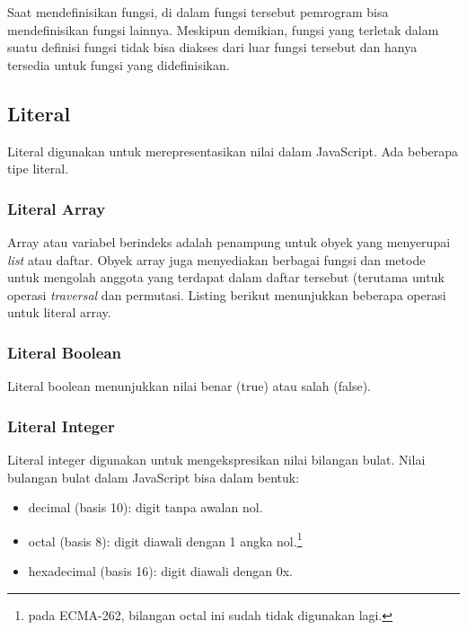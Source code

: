 Saat mendefinisikan fungsi, di dalam fungsi tersebut pemrogram bisa mendefinisikan fungsi lainnya. Meskipun demikian, fungsi yang terletak dalam suatu definisi fungsi tidak bisa diakses dari luar fungsi tersebut dan hanya tersedia untuk fungsi yang didefinisikan.

\lstset{language=JavaScript,caption=Fungsi di dalam Fungsi}


\subsection{Literal}

Literal digunakan untuk merepresentasikan nilai dalam JavaScript. Ada beberapa tipe literal.

\subsubsection{Literal Array}

Array atau variabel berindeks adalah penampung untuk obyek yang menyerupai \textit{list} atau daftar. Obyek array juga menyediakan berbagai fungsi dan metode untuk mengolah anggota yang terdapat dalam daftar tersebut (terutama untuk operasi \textit{traversal} dan permutasi. Listing berikut menunjukkan beberapa operasi untuk literal array.

\lstset{language=JavaScript,caption=Array di JavaScript}


\subsubsection{Literal Boolean}

Literal boolean menunjukkan nilai benar (true) atau salah (false).

\subsubsection{Literal Integer}

Literal integer digunakan untuk mengekspresikan nilai bilangan bulat. Nilai bulangan bulat dalam JavaScript bisa dalam bentuk:
\begin{itemize}
  \item decimal (basis 10): digit tanpa awalan nol.
  \item octal (basis 8): digit diawali dengan 1 angka nol.\footnote{pada ECMA-262, bilangan octal ini sudah tidak digunakan lagi.}
  \item hexadecimal (basis 16): digit diawali dengan 0x.
\end{itemize}

